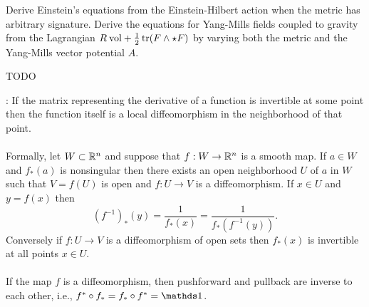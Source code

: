 \documentclass[10pt]{article}
\begin{document}
\begin{example}
	Derive Einstein's equations from the Einstein-Hilbert action when the metric has arbitrary signature. Derive the equations for Yang-Mills fields coupled to gravity from the Lagrangian $R\:\text{vol}+\frac12\tr(F\wedge\star F)$ by varying both the metric and the Yang-Mills vector potential $A$.
\end{example}
\sol TODO


\begin{definition}
	: If the matrix representing the derivative of a function is invertible at some point then the function itself is a local diffeomorphism in the neighborhood of that point.\\\\
	Formally, let $W \subset \mathbb{R}^n$ and suppose that $f:W\to\mathbb{R}^n$ is a smooth map. If $a\in W$ and $f_*(a)$ is nonsingular then there exists an open neighborhood $U$ of $a$ in $W$ such that $V=f(U)$ is open and $f:U\to V$ is a diffeomorphism. If $x\in U$ and $y=f(x)$ then
	$$
	(f^{-1})_*(y) = \frac{1}{f_*(x)} = \frac{1}{f_*(f^{-1}(y))}.
	$$
	Conversely if $f:U\to V$ is a diffeomorphism of open sets then $f_*(x)$ is invertible at all points $x\in U$.\\\\
	If the map $f$ is a diffeomorphism, then pushforward and pullback are inverse to each other, i.e., $f^* \circ f_* = f_* \circ f^* = \id$.
\end{definition}
\end{document}
